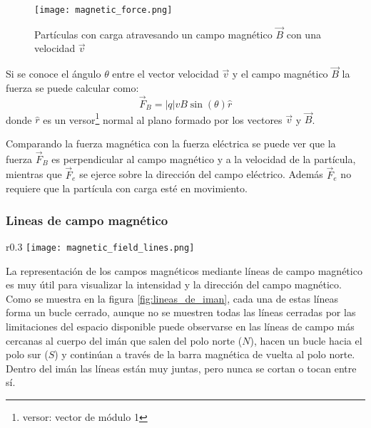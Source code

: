 \begin{figure}[ht]
  \centering
  \texttt{[image: magnetic\_force.png]}
  \caption{Partículas con carga atravesando un campo magnético \(\vec{B}\) con una velocidad \(\vec{v}\)}
\end{figure}

Si se conoce el ángulo \(\theta\) entre el vector velocidad \(\vec{v}\) y el campo magnético \(\vec{B}\) la fuerza se puede calcular como:
\[
  \vec{F}_B = \left\lvert q \right\rvert v B \sin(\theta) \hat{r}
\]
donde \(\hat{r}\) es un versor\footnote{versor: vector de módulo 1} normal al plano formado por los vectores \(\vec{v}\) y \(\vec{B}\). 

Comparando la fuerza magnética con la fuerza eléctrica se puede ver que la fuerza \(\vec{F}_B\) es perpendicular al campo magnético y a la velocidad de la partícula, mientras que \(\vec{F}_e\) se ejerce sobre la dirección del campo eléctrico. Además \(\vec{F}_e\) no requiere que la partícula con carga esté en movimiento.

\subsubsection{Lineas de campo magnético}

\begin{wrapfigure}{r}{0.3\textwidth}
  \centering
  \texttt{[image: magnetic\_field\_lines.png]}
  \caption{Líneas de campo magnético.}
  \label{fig:lineas_de_iman}
\end{wrapfigure}
La representación de los campos magnéticos mediante líneas de campo magnético es muy útil para visualizar la intensidad y la dirección del campo magnético. Como se muestra en la figura \ref{fig:lineas_de_iman}, cada una de estas líneas forma un bucle cerrado, aunque no se muestren todas las líneas cerradas por las limitaciones del espacio disponible puede observarse en las líneas de campo más cercanas al cuerpo del imán que salen del polo norte (\(N\)), hacen un bucle hacia el polo sur (\(S\)) y continúan a través de la barra magnética de vuelta al polo norte. Dentro del imán las líneas están muy juntas, pero nunca se cortan o tocan entre sí.

